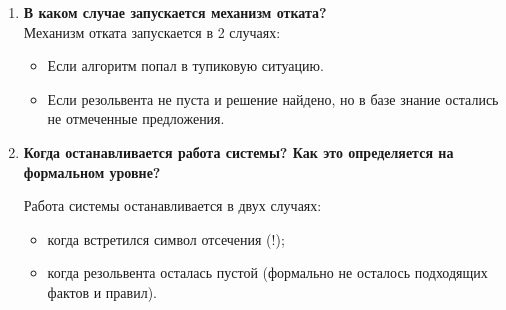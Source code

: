 \begin{enumerate}
   

    \item \textbf{В каком случае запускается механизм отката?}\\
    Механизм отката запускается в 2 случаях:
    \begin{itemize}
    	\item Если алгоритм попал в тупиковую ситуацию. 
    	\item Если резольвента не пуста и решение найдено, но в базе знание остались не отмеченные предложения.
    \end{itemize}  


\item \textbf{Когда останавливается работа системы? Как это определяется на формальном уровне?}

Работа системы останавливается в двух случаях:

\begin{itemize}
	\item когда встретился символ отсечения (!);
	\item когда резольвента осталась пустой (формально не осталось подходящих фактов и правил).
\end{itemize}
\end{enumerate}

